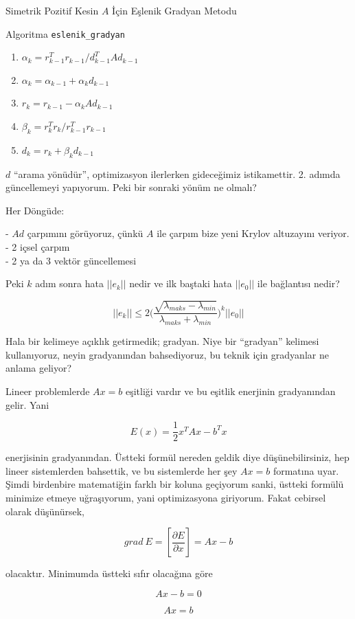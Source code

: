 \documentclass[12pt,fleqn]{article}\usepackage{../../common}
\begin{document}
Simetrik Pozitif Kesin $A$ İçin Eşlenik Gradyan Metodu

Algoritma \verb!eslenik_gradyan!
\begin{enumerate}
  \item $\alpha_k = r_{k-1}^T r_{k-1} / d_{k-1}^T A d_{k-1}$ 
  \item $\alpha_k = \alpha_{k-1} + \alpha_k d_{k-1}$
  \item $r_k = r_{k-1} - \alpha_k Ad_{k-1}$
  \item $\beta_k = r_k^Tr_k / r_{k-1}^Tr_{k-1}$
  \item $d_k = r_k + \beta_k d_{k-1}$
\end{enumerate}

$d$ ``arama yönüdür'', optimizasyon ilerlerken gideceğimiz
istikamettir. 2. adımda güncellemeyi yapıyorum. Peki bir sonraki yönüm ne
olmalı?

Her Döngüde:

- $Ad$ çarpımını görüyoruz, çünkü $A$ ile çarpım bize yeni Krylov altuzayını
veriyor.\\
- 2 içsel çarpım \\
- 2 ya da 3 vektör güncellemesi

Peki $k$ adım sonra hata $||e_k||$ nedir ve ilk baştaki hata $||e_0||$ ile
bağlantısı nedir? 

$$ ||e_k|| \le 2  \bigg(
\frac{ \sqrt{ \lambda_{maks} - \lambda_{min}}}
{\lambda_{maks} + \lambda_{min}}
\bigg)^k||e_0||
$$

Hala bir kelimeye açıklık getirmedik; gradyan. Niye bir ``gradyan''
kelimesi kullanıyoruz, neyin gradyanından bahsediyoruz, bu teknik için
gradyanlar ne anlama geliyor?

Lineer problemlerde $Ax = b$ eşitliği vardır ve bu eşitlik enerjinin
gradyanından gelir. Yani 

$$ E(x) = \frac{ 1}{2}x^TAx - b^Tx $$

enerjisinin gradyanından. Üstteki formül nereden geldik diye
düşünebilirsiniz, hep lineer sistemlerden bahsettik, ve bu sistemlerde her
şey $Ax = b$ formatına uyar. Şimdi birdenbire matematiğin farklı bir koluna
geçiyorum sanki, üstteki formülü minimize etmeye uğraşıyorum, yani
optimizasyona giriyorum. Fakat cebirsel olarak düşünürsek, 

$$ grad \ E = [\frac{\partial E}{\partial x} ]  = Ax - b $$

olacaktır. Minimumda üstteki sıfır olacağına göre 

$$ Ax - b = 0 $$

$$ Ax = b $$
\end{document}
